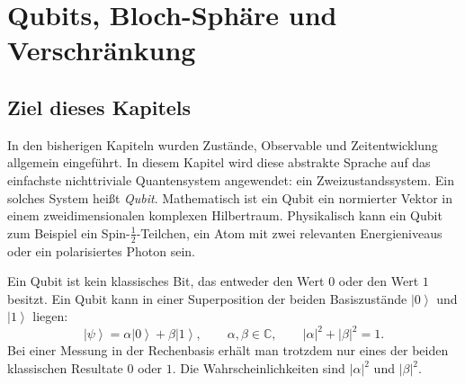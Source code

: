 \providecommand{\ket}[1]{\left|#1\right\rangle}
\providecommand{\bra}[1]{\left\langle#1\right|}
\providecommand{\braket}[2]{\left\langle#1\middle|#2\right\rangle}
\providecommand{\mel}[3]{\left\langle#1\middle|#2\middle|#3\right\rangle}
\providecommand{\proj}[1]{\left|#1\right\rangle\left\langle#1\right|}
\providecommand{\ii}{\mathrm{i}}
\providecommand{\e}{\mathrm{e}}
\providecommand{\idop}{\mathbf{1}}
\providecommand{\Tr}{\operatorname{Tr}}
\providecommand{\diag}{\operatorname{diag}}
\providecommand{\C}{\mathbb C}

\chapter{Qubits, Bloch-Sphäre und Verschränkung}

\section{Ziel dieses Kapitels}

In den bisherigen Kapiteln wurden Zustände, Observable und Zeitentwicklung allgemein eingeführt. In diesem Kapitel wird diese abstrakte Sprache auf das einfachste nichttriviale Quantensystem angewendet: ein Zweizustandssystem. Ein solches System heißt \emph{Qubit}. Mathematisch ist ein Qubit ein normierter Vektor in einem zweidimensionalen komplexen Hilbertraum. Physikalisch kann ein Qubit zum Beispiel ein Spin-\(\frac12\)-Teilchen, ein Atom mit zwei relevanten Energieniveaus oder ein polarisiertes Photon sein.

\begin{conceptbox}
Ein Qubit ist kein klassisches Bit, das entweder den Wert \(0\) oder den Wert \(1\) besitzt. Ein Qubit kann in einer Superposition der beiden Basiszustände \(\ket{0}\) und \(\ket{1}\) liegen:
\[
    \ket{\psi}=\alpha\ket{0}+\beta\ket{1},
    \qquad \alpha,\beta\in\C,
    \qquad |\alpha|^2+|\beta|^2=1.
\]
Bei einer Messung in der Rechenbasis erhält man trotzdem nur eines der beiden klassischen Resultate \(0\) oder \(1\). Die Wahrscheinlichkeiten sind \(|\alpha|^2\) und \(|\beta|^2\).
\end{conceptbox}

